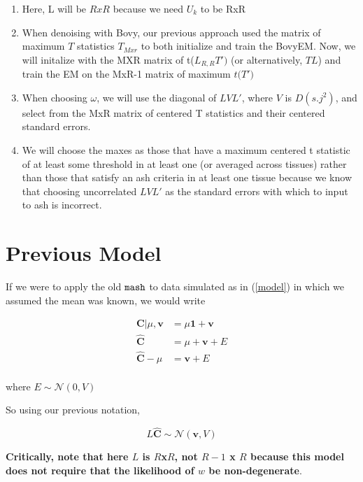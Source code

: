 \documentclass[11pt, oneside]{article}   	%
\newcommand{\Norm}{{\mathcal{N}}} %
\newcommand{\ceff}{\bm{C}}
\newcommand{\chat}{\bm{\hat{C}}}
\newcommand{\vb}{\bm{v}}
\def\lstar{\text{ L}}
\def\mash{{\tt mash }}
\begin{document}
\begin{itemize}
\begin{enumerate}
\item Here, L will be $RxR$ because we need $U_{k}$ to be RxR
\item When denoising with Bovy, our previous approach used the matrix of maximum $T$ statistics $T_{Mxr}$ to both initialize and train the BovyEM. Now, we will initalize with the MXR matrix of t($L_{R,R}T')$ (or alternatively, $TL$) and train the EM on the MxR-1 matrix of maximum $t($\lstar$T')$
\item When choosing $\omega$, we will use the diagonal of $L V L'$, where $V$ is $D(s.j^2)$, and select from the MxR matrix of centered T statistics and their centered standard errors.
\item We will choose the maxes as those that have a maximum centered t statistic of at least some threshold in at least one (or averaged across tissues) rather than those that satisfy an ash criteria in at least one tissue because we know that choosing uncorrelated $L V L'$ as the standard errors with which to input to ash  is incorrect.
\end{enumerate}


\section{Previous Model}

If we were to apply the old $\mash$ to data simulated as in (\ref{model}) in which we assumed the mean was known, we would write

\begin{equation}
\label{mashmodel}
\begin{aligned}
\ceff | \mu, \vb  &= \mu \bm{1} + \vb \\
\chat &= \mu + \vb + E \\
\chat - \mu &= \vb + E \\
\end{aligned}
\end{equation}

where $E \sim \Norm (0, V)$

So using our previous notation, 

\begin{equation}
\label{mashlik}
L \chat \sim \Norm(\vb,V)
\end{equation}


\textbf{Critically, note that here $L$ is $R$x$R$, not $R-1$ x $R$ because this model does not require that the likelihood of $w$ be non-degenerate}. 


\end{itemize}
\end{document}
